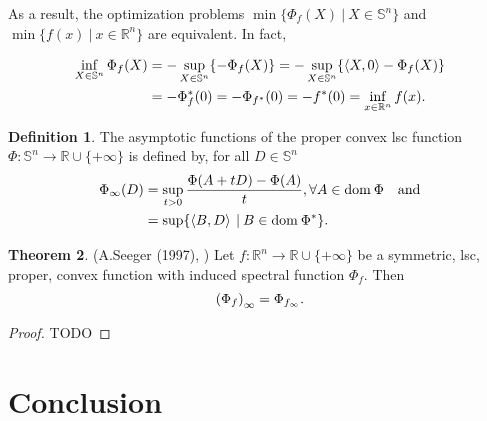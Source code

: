 \documentclass[a4paper,11pt, oneside]{book}
\theoremstyle{definition}
\newtheorem{dfn}{Definition}[section]
\newtheorem{thm}[dfn]{Theorem}
\newcommand{\RealNumberSet}{\mathbb{R}}
\newcommand{\NDemenstionalRealEuclideanSpace}{\mathbb{R}^n}
\newcommand{\NDemenstionalRealSymmetricMatrixSpace}{\mathbb{S}^n}
\newcommand{\Domain}[1]{\text{\rm dom\:${#1}$}} %
\newcommand{\InnerProduct}[2]{\left\langle {#1},{#2}\right\rangle} %
\newcommand{\ExtendedRealValuedFunction}[2]{{#1}: {#2} \to \RealNumberSet \cup \{+\infty\}}
\newcommand{\ConjugateFunction}[1]{{#1}^*}
\begin{document}
As a result, the optimization problems $\min \{\Phi_{f}(X) \:|\: X \in \NDemenstionalRealSymmetricMatrixSpace\}$ and $\min \{f(x) \:|\: x \in \NDemenstionalRealEuclideanSpace\}$ are equivalent. In fact,

\begin{align}
  \inf_{X \in \NDemenstionalRealSymmetricMatrixSpace} \Phi_{f}(X) &= - \sup_{X \in \NDemenstionalRealSymmetricMatrixSpace} \{- \Phi_{f}(X)\} = - \sup_{X \in \NDemenstionalRealSymmetricMatrixSpace} \{\InnerProduct{X}{0} - \Phi_{f}(X)\} \notag \\
  &= - \Phi^*_{f}(0) = - \Phi_{\ConjugateFunction{f}}(0) = - \ConjugateFunction{f}(0) = \inf_{x \in \NDemenstionalRealEuclideanSpace} f(x). \notag
\end{align}

\begin{dfn}
  The asymptotic functions of the proper convex lsc function $\ExtendedRealValuedFunction{\Phi}{\NDemenstionalRealSymmetricMatrixSpace}$ is defined by, for all $D \in \NDemenstionalRealSymmetricMatrixSpace$
  \begin{equation}
    \begin{split}
      \Phi_{\infty} (D) &= \sup_{t > 0} \frac{\Phi(A+tD) -\Phi(A)}{t}, \forall A \in \Domain{\Phi} \quad \text{and} \\
      &= \sup \{\InnerProduct{B}{D} \:|\: B \in \Domain{\ConjugateFunction{\Phi}}\}. \notag
    \end{split}
  \end{equation}
\end{dfn}

\begin{thm}{(A.Seeger (1997), \cite{Seeger97})}
  Let $\ExtendedRealValuedFunction{f}{\NDemenstionalRealEuclideanSpace}$ be a symmetric, lsc, proper, convex function with induced spectral function $\Phi_{f}$. Then
  \begin{equation}
    {(\Phi_{f})}_{\infty} = \Phi_{f_{\infty}}. \notag
  \end{equation}
\end{thm}

\begin{proof}
  TODO
\end{proof}
\chapter{Conclusion}
\end{document}
